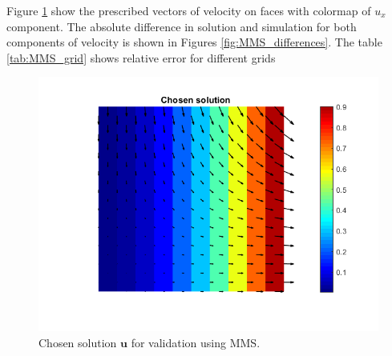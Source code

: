 \documentclass[]{article}
\begin{document}
Figure \ref{fig:mmssolution} show the prescribed vectors of velocity on faces with colormap of $ u_x $ component. The absolute difference in solution and simulation for both components of velocity is shown in Figures \ref{fig:MMS_differences}. The table \ref{tab:MMS_grid} shows relative error for different grids 

\begin{figure}
	\centering
	\includegraphics[width=0.7\linewidth]{figs/MMS_solution}
	\caption{Chosen solution $ \mathbf{u} $ for validation using MMS.}
	\label{fig:mmssolution}
\end{figure}
\end{document}
